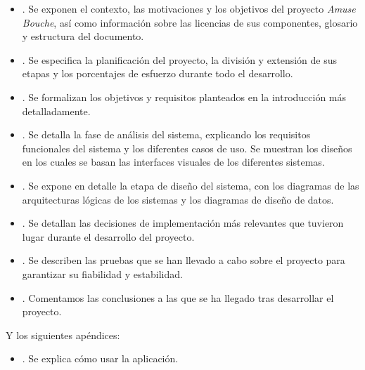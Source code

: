 \begin{itemize}
\item \textbf{}. Se exponen el contexto, las
  motivaciones y los objetivos del proyecto \textit{Amuse Bouche}, así como
  información sobre las licencias de sus componentes, glosario y estructura del
  documento.

\item \textbf{}. Se especifica la planificación del
  proyecto, la división y extensión de sus etapas y los porcentajes de esfuerzo
  durante todo el desarrollo.

\item \textbf{}. Se formalizan los objetivos y
  requisitos planteados en la introducción más detalladamente.

\item \textbf{}. Se detalla la fase de análisis del
  sistema, explicando los requisitos funcionales del sistema y los diferentes
  casos de uso. Se muestran los diseños en los cuales se basan las interfaces
  visuales de los diferentes sistemas.

\item \textbf{}. Se expone en detalle la etapa de diseño
  del sistema, con los diagramas de las arquitecturas lógicas de los sistemas y
  los diagramas de diseño de datos.

\item \textbf{}. Se detallan las decisiones de
  implementación más relevantes que tuvieron lugar durante el desarrollo del
  proyecto.

\item \textbf{}. Se describen las pruebas que se han
  llevado a cabo sobre el proyecto para garantizar su fiabilidad y estabilidad.

\item \textbf{}. Comentamos las conclusiones a las
  que se ha llegado tras desarrollar el proyecto.
\end{itemize}

Y los siguientes apéndices:
\begin{itemize}
\item \textbf{}. Se explica cómo usar la aplicación.
\end{itemize}
